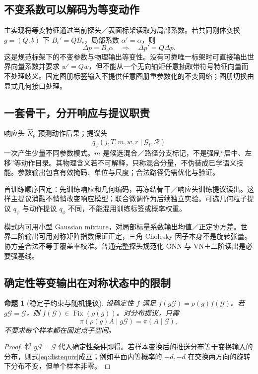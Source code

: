 \documentclass[UTF8,fontset=fandol,11pt,a4paper]{ctexart}
\theoremstyle{plain}
\newtheorem{proposition}[theorem]{命题}
\theoremstyle{definition}
\theoremstyle{remark}
\numberwithin{equation}{section}
\newcommand{\cR}{\mathcal R}
\DeclareMathOperator{\Fix}{Fix}
\begin{document}
\subsection{不变系数可以解码为等变动作}
主实现将等变特征通过当前探头／表面标架读取为局部系数。若共同刚体变换 $g=(Q,b)$ 下 $B_c'=QB_c$，局部系数 $\alpha'=\alpha$，则
\begin{equation}
\Delta p=B_c\alpha\quad\Longrightarrow\quad\Delta p'=Q\Delta p.
\end{equation}
这是规范标架下的不变参数与物理输出等变性。没有可靠唯一标架时可直接输出世界向量系数并要求 $w'=Qw$，但不能从一个无向轴矩任意抽取带符号特征向量而不处理歧义。固定图册标签输入不提供任意图册重参数化的不变网络；图册切换由显式几何接口处理。

\subsection{一套骨干，分开响应与提议职责}
响应头 $\widehat K_\theta$ 预测动作后果；提议头
\begin{equation}
q_\phi(j,T,m,w,r\mid\mathcal G_t,\cR)
\label{eq:proposal}
\end{equation}
一次产生少量不同参数模式。$m$ 是候选混合／路径分支标记，不是强制“居中、左移”等动作目录。其物理含义若不可解释，只称混合分量，不伪装成已学语义技能。参数输出包含有效掩码、单位与尺度；合法路径仍需优化与验证。

首训练顺序固定：先训练响应和几何编码，再冻结骨干／响应头训练提议读出。这样主提议消融不悄悄改变响应模型；联合微调作为后续独立实验。可选几何粒子提议 $q_\psi$ 与动作提议 $q_\phi$ 不同，不能混用训练标签或概率权重。

模式内可用小型 Gaussian mixture，对局部标量系数输出均值／正定协方差。世界二阶输出可用对称矩阵指数保证正定，三角 Cholesky 因子本身不是旋转张量。协方差合法不等于覆盖率校准。普通完整探头规范化 GNN 与 VN＋二阶读出是必要强基线。

\subsection{确定性等变输出在对称状态中的限制}
\begin{proposition}[稳定子约束与随机提议]
设确定性 $f$ 满足 $f(g\mathcal G)=\rho(g)f(\mathcal G)$。若 $g\mathcal G=\mathcal G$，则 $f(\mathcal G)\in\Fix(\rho(g))$。对分布提议，只需
\begin{equation}
\pi(\rho(g)A\mid g\mathcal G)=\pi(A\mid\mathcal G),
\label{eq:distequiv}
\end{equation}
不要求每个样本都在固定点子空间。
\end{proposition}
\begin{proof}
将 $g\mathcal G=\mathcal G$ 代入确定性条件即得。若样本变换后的推送分布等于变换输入的分布，则式\eqref{eq:distequiv}成立；例如平面内等概率的 $+d,-d$ 在交换两方向的旋转下分布不变，但单个样本非零。
\end{proof}
\end{document}
